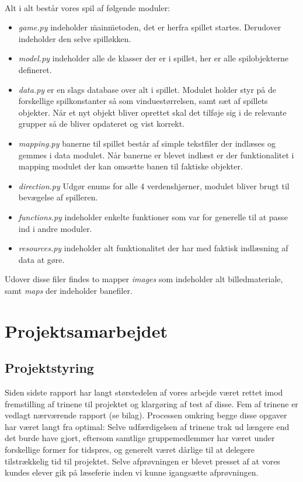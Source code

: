 \documentclass[10pt,a4paper,danish]{article}
\begin{document}
\paragraph {} 
Alt i alt består vores spil af følgende moduler: 
\begin{itemize}
\item \textit{game.py} indeholder \"main\" metoden, det er herfra spillet startes. Derudover indeholder den selve spilløkken.
\item \textit{model.py} indeholder alle de klasser der er i spillet, her er alle spilobjekterne defineret.
\item \textit{data.py} er en slags database over alt i spillet. Modulet holder styr på de forskellige spilkonstanter så som vinduestørrelsen, samt sæt af spillets objekter. Når et nyt objekt bliver oprettet skal det tilføje sig i de relevante grupper så de bliver opdateret og vist korrekt.
\item \textit{mapping.py} banerne til spillet består af simple tekstfiler der indlæses og gemmes i data modulet. Når banerne er blevet indlæst er der funktionalitet i mapping modulet der kan omsætte banen til faktiske objekter.
\item \textit{direction.py} Udgør enums for alle 4 verdenshjørner, modulet bliver brugt til bevægelse af spilleren.
\item \textit{functions.py} indeholder enkelte funktioner som var for generelle til at passe ind i andre moduler.
\item \textit{resources.py} indeholder alt funktionalitet der har med faktisk indlæsning af data at gøre.
\end{itemize}

Udover disse filer findes to mapper \textit{images} som indeholder alt billedmateriale, samt \textit{maps} der indeholder banefiler.

\section{Projektsamarbejdet}
\subsection{Projektstyring}
Siden sidste rapport har langt størstedelen af vores arbejde været rettet imod
fremstilling af trinene til projektet og klargøring af test af disse. Fem af trinene
er vedlagt nærværende rapport (se bilag). Processen
omkring begge disse opgaver har været langt fra optimal: Selve udfærdigelsen af 
trinene trak ud længere end det burde have gjort, eftersom samtlige gruppemedlemmer
har været under forskellige former for tidspres, og generelt været dårlige til 
at delegere tilstrækkelig tid til projektet. Selve afprøvningen er blevet presset
af at vores kundes elever gik på læseferie inden vi kunne igangsætte afprøvningen. 
\end{document}
